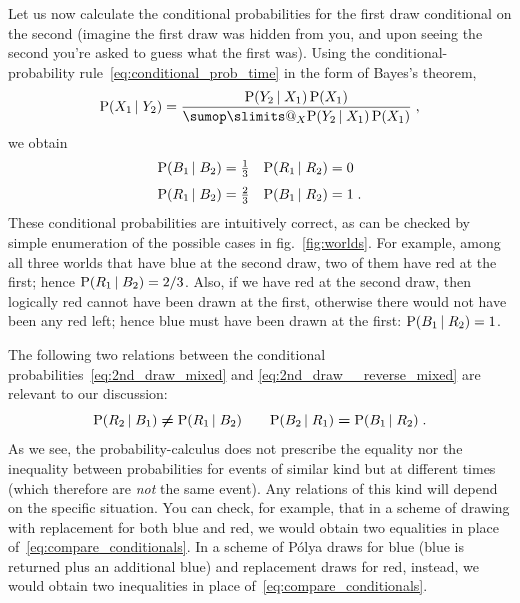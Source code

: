 \documentclass[\ifafour a4paper,12pt,\else a5paper,10pt,\fi%
onecolumn,oneside,article,%
british%
]{memoir}
\makeatletter
\theoremstyle{remark}
\theoremstyle{innote}
\def\sum{\DOTSI\sumop\slimits@}
\newcommand*{\p}{\mathrm{P}}%
\renewcommand*{\|}[1][]{\nonscript\,#1\vert\nonscript\;\mathopen{}}
\newcommand*{\fig}{fig.}%
\makeatother
\begin{document}
Let us now calculate the conditional probabilities for the first draw
conditional on the second (imagine the first draw was hidden from you, and
upon seeing the second you're asked to guess what the first was). Using
the conditional-probability rule~\eqref{eq:conditional_prob_time} in the form of
Bayes's theorem,
\begin{equation}
  \label{eq:bayes}
  \p(X_{1} \| Y_{2}) = \frac{\p(Y_{2} \| X_{1})\, \p(X_{1})}{
   \sum_{X} \p(Y_{2} \| X_{1})\, \p(X_{1})} \;,
\end{equation}
we obtain
\begin{subequations}
  \label{eq:2nd_draw_reverse}
  \begin{align}
    \p(B_{1} \|B_{2}) &= \tfrac{1}{3}
    & \p(R_{1} \| R_{2}) &= 0
    \\[\jot]
    \p(R_{1} \|B_{2}) &= \tfrac{2}{3}
    & \p(B_{1} \| R_{2}) &= 1 \;.
      \label{eq:2nd_draw__reverse_mixed}
  \end{align}
\end{subequations}
These conditional probabilities are intuitively correct, as can be checked
by simple enumeration of the possible cases in \fig~\ref{fig:worlds}. For
example, among all three worlds that have blue at the second draw, two of
them have red at the first; hence $\p(R_{1} \|B_{2}) = 2/3$. Also, if we
have red at the second draw, then logically red cannot have been drawn at
the first, otherwise there would not have been any red left; hence blue
must have been drawn at the first: $\p(B_{1} \| R_{2}) = 1$.

\medskip

The following two relations between the conditional
probabilities~\eqref{eq:2nd_draw_mixed} and
\eqref{eq:2nd_draw__reverse_mixed} are relevant to our discussion:
\begin{equation}
  \label{eq:compare_conditionals}
  \p(R_{2} \|B_{1}) \mathrel{\bm{\ne}} \p(R_{1} \|B_{2}) \qquad
    \p(B_{2} \| R_{1}) \mathrel{\bm{=}} \p(B_{1} \| R_{2}) \;.
\end{equation}
As we see, the probability-calculus does not prescribe the equality nor the
inequality between probabilities for events of similar kind but at
different times (which therefore are \emph{not} the same event). Any
relations of this kind will depend on the specific situation. You can
check, for example, that in a scheme of drawing with replacement for both
blue and red, we would obtain two equalities in place
of~\eqref{eq:compare_conditionals}. In a scheme of P\'olya draws for blue
(blue is returned plus an additional blue) and replacement draws for red,
instead, we would obtain two inequalities in place
of~\eqref{eq:compare_conditionals}.
\end{document}
